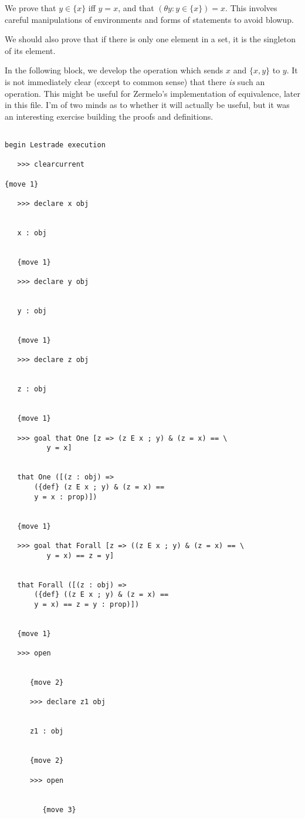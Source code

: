 \documentclass[12pt]{article}
\begin{document}
We prove that $y \in \{x\}$ iff $y=x$, and that $(\theta y: y \in \{x\})=x$.  This involves careful manipulations of environments and forms of statements to avoid blowup.

We should also prove that if there is only one element in a set, it is the singleton of its element.

In the following block, we develop the operation which sends $x$ and $\{x,y\}$ to $y$.  It is not immediately clear (except to common sense) that there
{\em is\/} such an operation.  This might be useful for Zermelo's implementation of equivalence, later in this file.  I'm of two minds as to whether it will actually be useful, but it was an interesting exercise building the proofs and definitions.

\begin{verbatim}

begin Lestrade execution

   >>> clearcurrent

{move 1}

   >>> declare x obj


   x : obj


   {move 1}

   >>> declare y obj


   y : obj


   {move 1}

   >>> declare z obj


   z : obj


   {move 1}

   >>> goal that One [z => (z E x ; y) & (z = x) == \
          y = x]


   that One ([(z : obj) => 
       ({def} (z E x ; y) & (z = x) == 
       y = x : prop)])


   {move 1}

   >>> goal that Forall [z => ((z E x ; y) & (z = x) == \
          y = x) == z = y]


   that Forall ([(z : obj) => 
       ({def} ((z E x ; y) & (z = x) == 
       y = x) == z = y : prop)])


   {move 1}

   >>> open


      {move 2}

      >>> declare z1 obj


      z1 : obj


      {move 2}

      >>> open


         {move 3}


\end{verbatim}
\end{document}
